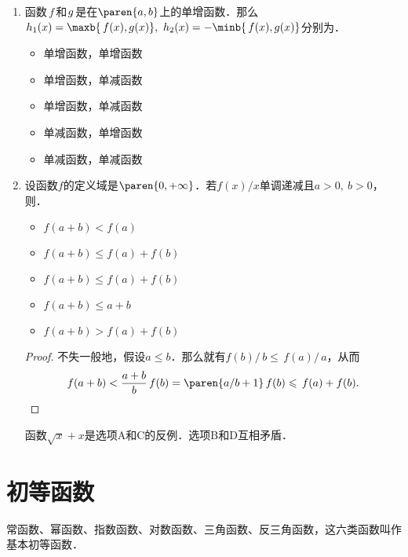 \begin{enumerate}
\item 函数\(\,f\,\)和\(\mkern2mu g\mkern1mu\)是在\(\paren{a,b}\)上的单增函数．那么\(h_1(x) = \maxb{\,f(x), g(x)},\ h_2(x) = -\minb{\,f(x), g(x)}\)分别为\uline{\makebox[6em]{}}．
  \begin{itemize}
    \renewcommand{\labelitemi}{\faCircleThin}
  \item 单增函数，单增函数
    \ifshowsol
    \item[\faCircle] 单增函数，单减函数
    \else
    \item 单增函数，单减函数
    \fi
  \item 单减函数，单增函数
  \item 单减函数，单减函数
  \end{itemize}

\item 设函数\(f\)的定义域是\(\paren{0,+\infty}\)．若\(f(x)/x\)单调递减且\(a > 0,\ b > 0\)，则\uline{\makebox[6em]{}}．
  \begin{itemize}
    \renewcommand{\labelitemi}{\faCircleThin}
  \item \(f(a+b) < f(a)\)
    \ifshowsol
    \item[\faCircle] \(f(a+b) \le f(a) + f(b)\)
    \else
    \item \(f(a+b) \le f(a) + f(b)\)
    \fi
  \item \(f(a+b) \le a + b\)
  \item \(f(a+b) > f(a) + f(b)\)
  \end{itemize}

  \ifshowsol
    \begin{proof}
      不失一般地，假设\(a \le b\)．那么就有\(f(b)/\,b \le \,f(a)/\,a\)，从而
      \begin{equation*}
        f(a+b)
        < \frac{a+b}{b} \,f(b) \\
        = \paren{a/b + 1} \,f(b) \\
        \le \,f(a) + f(b). \qedhere
      \end{equation*}
    \end{proof}
    函数\(\sqrt x + x\)是选项A和C的反例．选项B和D互相矛盾．
  \fi
\end{enumerate}
\fi

\section{初等函数}

\begin{definition*}
  常函数、幂函数、指数函数、对数函数、三角函数、反三角函数，这六类函数叫作基本初等函数．
\end{definition*}

